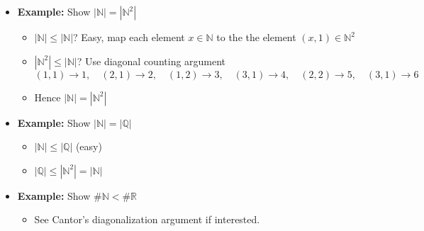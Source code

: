 \documentclass[11pt,twoside]{report}
\newcommand{\bbN}{{\mathbb{N}}}
\newcommand{\bbR}{{\mathbb{R}}}
\newcommand{\bbQ}{{\mathbb{Q}}}
\begin{document}
\begin{itemize}
          
\item \textbf{Example:}  Show $| \bbN| =| \bbN^2|$
\begin{itemize}
\item  $| \bbN| \le |\bbN|$?    Easy,  map each element $x \in \bbN$ to the the element $(x, 1) \in \bbN^2$
\item  $|\bbN^2| \le | \bbN|$? Use diagonal counting argument
\[(1,1) \to 1, \quad (2,1) \to 2, \quad (1,2) \to 3, 	\quad (3,1) \to 4, \quad (2,2) \to 5 , \quad (3, 1) \to 6\]
\item Hence $| \bbN|  = | \bbN^2|$%
\end{itemize} 
          
 \item \textbf{Example:} Show $|\bbN| = | \bbQ|$   %
\begin{itemize}
\item  $|\bbN | \le | \bbQ|$  (easy) %
\item $|\bbQ|  \le  | \bbN^2 |  =  |  \bbN | $
\end{itemize} 

 
  \item \textbf{Example:} Show $\# \bbN <   \# \bbR$  
  \begin{itemize}
\item   See Cantor's diagonalization argument if interested. 
%
%
\end{itemize} 
 

\end{itemize}
\end{document}
